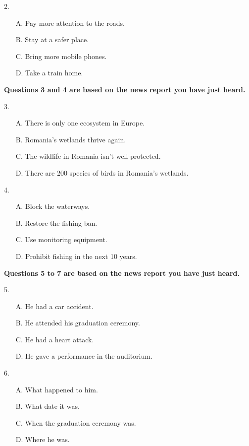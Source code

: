 \documentclass[UTF8,11pt]{ctexart}
\begin{document}
2.


\begin{itemize}[leftmargin=2em,itemsep=.2em,topsep=.4em]\item[A.] Pay more attention to the roads.
\item[B.] Stay at a safer place.
\item[C.] Bring more mobile phones.
\item[D.] Take a train home.
\end{itemize}

\textbf{Questions 3 and 4 are based on the news report you have just heard.}


3.


\begin{itemize}[leftmargin=2em,itemsep=.2em,topsep=.4em]\item[A.] There is only one ecosystem in Europe.
\item[B.] Romania's wetlands thrive again.
\item[C.] The wildlife in Romania isn't well protected.
\item[D.] There are 200 species of birds in Romania's wetlands.
\end{itemize}

4.


\begin{itemize}[leftmargin=2em,itemsep=.2em,topsep=.4em]\item[A.] Block the waterways.
\item[B.] Restore the fishing ban.
\item[C.] Use monitoring equipment.
\item[D.] Prohibit fishing in the next 10 years.
\end{itemize}

\textbf{Questions 5 to 7 are based on the news report you have just heard.}


5.


\begin{itemize}[leftmargin=2em,itemsep=.2em,topsep=.4em]\item[A.] He had a car accident.
\item[B.] He attended his graduation ceremony.
\item[C.] He had a heart attack.
\item[D.] He gave a performance in the auditorium.
\end{itemize}

6.


\begin{itemize}[leftmargin=2em,itemsep=.2em,topsep=.4em]\item[A.] What happened to him.
\item[B.] What date it was.
\item[C.] When the graduation ceremony was.
\item[D.] Where he was.
\end{itemize}
\end{document}
